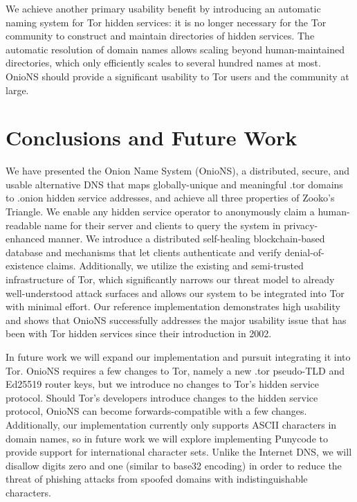 \documentclass[conference]{IEEEtran}
\begin{document}

We achieve another primary usability benefit by introducing an automatic naming system for Tor hidden services: it is no longer necessary for the Tor community to construct and maintain directories of hidden services. The automatic resolution of domain names allows scaling beyond human-maintained directories, which only efficiently scales to several hundred names at most. OnioNS should provide a significant usability to Tor users and the community at large.

\section{Conclusions and Future Work}

We have presented the Onion Name System (OnioNS), a distributed, secure, and usable alternative DNS that maps globally-unique and meaningful .tor domains to .onion hidden service addresses, and achieve all three properties of Zooko's Triangle. We enable any hidden service operator to anonymously claim a human-readable name for their server and clients to query the system in privacy-enhanced manner. We introduce a distributed self-healing blockchain-based database and mechanisms that let clients authenticate and verify denial-of-existence claims. Additionally, we utilize the existing and semi-trusted infrastructure of Tor, which significantly narrows our threat model to already well-understood attack surfaces and allows our system to be integrated into Tor with minimal effort. Our reference implementation demonstrates high usability and shows that OnioNS successfully addresses the major usability issue that has been with Tor hidden services since their introduction in 2002.

In future work we will expand our implementation and pursuit integrating it into Tor. OnioNS requires a few changes to Tor, namely a new .tor pseudo-TLD and Ed25519 router keys, but we introduce no changes to Tor's hidden service protocol. Should Tor's developers introduce changes to the hidden service protocol, OnioNS can become forwards-compatible with a few changes. Additionally, our implementation currently only supports ASCII characters in domain names, so in future work we will explore implementing Punycode to provide support for international character sets. Unlike the Internet DNS, we will disallow digits zero and one (similar to base32 encoding) in order to reduce the threat of phishing attacks from spoofed domains with indistinguishable characters.
\end{document}
